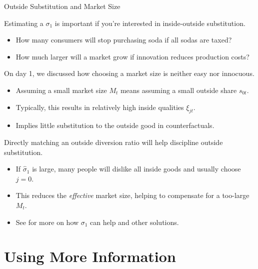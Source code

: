 \documentclass[aspectratio=169,t,11pt,table]{beamer}
\begin{document}
\begin{frame}{Outside Substitution and Market Size}
    \begin{wideitemize}
        \item Estimating a $\sigma_1$ is important if you're interested in inside-outside substitution.
        \begin{itemize}
            \item How many consumers will stop purchasing soda if all sodas are taxed?
            \item How much larger will a market grow if innovation reduces production costs?
        \end{itemize}
        \pause
        \item On day 1, we discussed how choosing a market size is neither easy nor innocuous.
        \begin{itemize}
            \item Assuming a small market size $M_t$ means assuming a small outside share $s_{0t}$.
            \item Typically, this results in relatively high inside qualities $\xi_{jt}$.
            \item Implies little substitution to the outside good in counterfactuals.
        \end{itemize}
        \pause
        \item Directly matching an outside diversion ratio will help discipline outside substitution.
        \begin{itemize}
            \item If $\hat{\sigma}_1$ is large, many people will dislike all inside goods and usually choose $j = 0$.
            \item This reduces the \textit{effective} market size, helping to compensate for a too-large $M_t$.
            \item See \cite{zhang2024identification} for more on how $\sigma_1$ can help and other solutions.
        \end{itemize}
    \end{wideitemize}
\end{frame}

\section{Using More Information}
\end{document}
